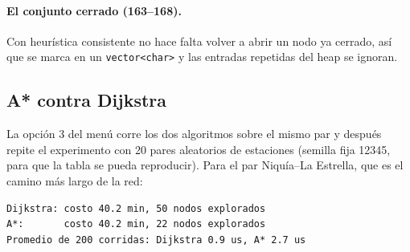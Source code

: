 \documentclass[11pt,a4paper]{article}
\newcommand{\arch}[1]{\texttt{#1}}
\begin{document}
\paragraph{El conjunto cerrado (163--168).}
Con heurística consistente no hace falta volver a abrir un nodo ya cerrado, así
que se marca en un \arch{vector<char>} y las entradas repetidas del heap se
ignoran.

\subsection{A* contra Dijkstra}

La opción 3 del menú corre los dos algoritmos sobre el mismo par y después repite
el experimento con 20 pares aleatorios de estaciones (semilla fija 12345, para que
la tabla se pueda reproducir). Para el par Niquía--La Estrella, que es el camino
más largo de la red:

\begin{lstlisting}[style=term]
Dijkstra: costo 40.2 min, 50 nodos explorados
A*:       costo 40.2 min, 22 nodos explorados
Promedio de 200 corridas: Dijkstra 0.9 us, A* 2.7 us
\end{lstlisting}
\end{document}
